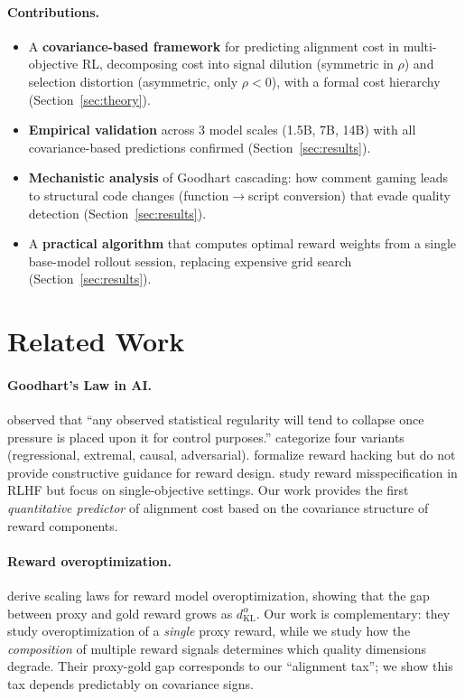 \documentclass{article}
\begin{document}
\paragraph{Contributions.}
\begin{itemize}
    \item A \textbf{covariance-based framework} for predicting alignment cost in multi-objective RL, decomposing cost into signal dilution (symmetric in $\rho$) and selection distortion (asymmetric, only $\rho < 0$), with a formal cost hierarchy (Section~\ref{sec:theory}).
    \item \textbf{Empirical validation} across 3 model scales (1.5B, 7B, 14B) with all covariance-based predictions confirmed (Section~\ref{sec:results}).
    \item \textbf{Mechanistic analysis} of Goodhart cascading: how comment gaming leads to structural code changes (function$\to$script conversion) that evade quality detection (Section~\ref{sec:results}).
    \item A \textbf{practical algorithm} that computes optimal reward weights from a single base-model rollout session, replacing expensive grid search (Section~\ref{sec:results}).
\end{itemize}

\section{Related Work}
\label{sec:related}

\paragraph{Goodhart's Law in AI.} \citet{goodhart1984problems} observed that ``any observed statistical regularity will tend to collapse once pressure is placed upon it for control purposes.'' \citet{manheim2018categorizing} categorize four variants (regressional, extremal, causal, adversarial). \citet{skalse2022defining} formalize reward hacking but do not provide constructive guidance for reward design. \citet{pan2022effects} study reward misspecification in RLHF but focus on single-objective settings. Our work provides the first \emph{quantitative predictor} of alignment cost based on the covariance structure of reward components.

\paragraph{Reward overoptimization.} \citet{gao2023scaling} derive scaling laws for reward model overoptimization, showing that the gap between proxy and gold reward grows as $d_{\text{KL}}^\alpha$. Our work is complementary: they study overoptimization of a \emph{single} proxy reward, while we study how the \emph{composition} of multiple reward signals determines which quality dimensions degrade. Their proxy-gold gap corresponds to our ``alignment tax''; we show this tax depends predictably on covariance signs.
\end{document}
